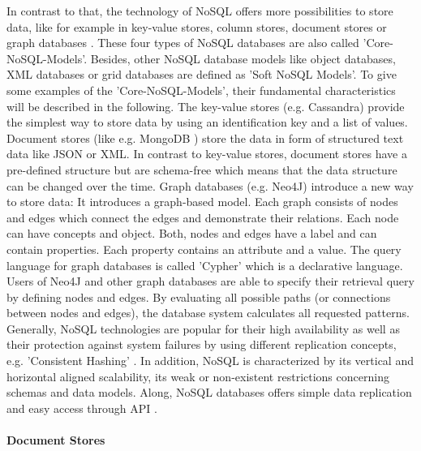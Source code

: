 In contrast to that, the technology of NoSQL offers more possibilities to store data, like for example in key-value stores, column stores, document stores or graph databases \cite[p.16 ff.]{nosql_meier}. These four types of NoSQL databases are also called 'Core-NoSQL-Models'. Besides, other NoSQL database models like object databases, \ac{XML} databases or grid databases are defined as 'Soft NoSQL Models'. 
To give some examples of the 'Core-NoSQL-Models', their fundamental characteristics will be described in the following. The key-value stores (e.g. Cassandra) provide the simplest way to store data by using an identification key and a list of values. Document stores (like e.g. MongoDB \pageref{mongodb}) store the data in form of structured text data like \ac{JSON} or XML. In contrast to key-value stores, document stores have a pre-defined structure but are schema-free which means that the data structure can be changed over the time. Graph databases (e.g. Neo4J) introduce a new way to store data: It introduces a graph-based model. Each graph consists of nodes and edges which connect the edges and demonstrate their relations. Each node can have concepts and object. Both, nodes and edges have a label and can contain properties. Each property contains an attribute and a value. The query language for graph databases is called 'Cypher' \cite[p.16 ff.]{nosql_meier} which is a declarative language. Users of Neo4J and other graph databases are able to specify their retrieval query by defining nodes and edges. By evaluating all possible paths (or connections between nodes and edges), the database system calculates all requested patterns.   
Generally, NoSQL technologies are popular for their high availability as well as their protection against system failures by using different replication concepts, e.g. 'Consistent Hashing' \cite[p.11 ff.]{nosql_meier}. In addition, NoSQL is characterized by its vertical and horizontal aligned scalability, its weak or non-existent restrictions concerning schemas and data models. Along, NoSQL databases offers simple data replication and easy access through API \cite[p.221 ff.]{nosql_meier}.  

\paragraph{Document Stores}

